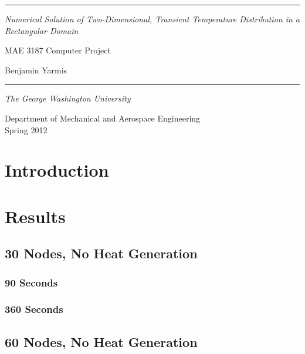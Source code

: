 \documentclass[12pt,letterpaper]{report}
\begin{document}
	\begin{titlepage}
		\hrule
		\vfill 
		\begin{center}
			\begin{Huge}
				\textit{Numerical Solution of Two-Dimensional, Transient Temperature Distribution in a Rectangular Domain}
			\end{Huge}
			\vfill 
			\begin{LARGE}
				MAE 3187 Computer Project\\
			\end{LARGE}
			\vfill 
			\begin{Large}
				Benjamin Yarmis\\
				\vfill
				\hrule
				\vfill 
				\textit{The George Washington University\\}
				\begin{large}
					Department of Mechanical and Aerospace Engineering\\
					Spring 2012\\
				\end{large}
			\end{Large}
		\end{center}
	\end{titlepage}
	
	\setcounter{secnumdepth}{0}
	\setcounter{tocdepth}{4}
	
	\tableofcontents
	
	\section{Introduction}
	
	\section{Results}
	\subsection{30 Nodes, No Heat Generation}
	\subsubsection{90 Seconds}
	\subsubsection{360 Seconds}
	
	\subsection{60 Nodes, No Heat Generation}
\end{document}
